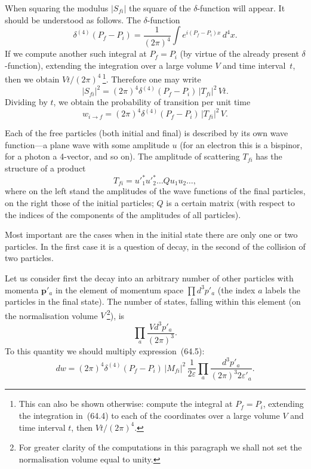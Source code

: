 When squaring the modulus $|S_{fi}|$ the square of the $\delta$-function will appear. It should be understood as follows. The $\delta$-function
\begin{equation}
\delta^{(4)}(P_f - P_i) = \frac{1}{(2\pi)^4}\int e^{i(P_f - P_i)x}\,d^4x.
\tag{64.4}
\end{equation}
If we compute another such integral at $P_f = P_i$ (by virtue of the already present $\delta$-function), extending the integration over a large volume $V$ and time interval~$t$, then we obtain $Vt/(2\pi)^4$\,\footnote{This can also be shown otherwise: compute the integral at $P_f = P_i$, extending the integration in~(64.4) to each of the coordinates over a large volume $V$ and time interval $t$, then $Vt/(2\pi)^4$.}. Therefore one may write
\[
|S_{fi}|^2 = (2\pi)^4\delta^{(4)}(P_f - P_i)\,|T_{fi}|^2\,Vt.
\]
Dividing by $t$, we obtain the probability of transition per unit time
\begin{equation}
w_{i\to f} = (2\pi)^4\delta^{(4)}(P_f - P_i)\,|T_{fi}|^2\,V.
\tag{64.5}
\end{equation}

Each of the free particles (both initial and final) is described by its own wave function---a plane wave with some amplitude $u$ (for an electron this is a bispinor, for a photon a 4-vector, and so on). The amplitude of scattering $T_{fi}$ has the structure of a product
\begin{equation}
T_{fi} = u'^*_1 u'^*_2 \ldots Q u_1 u_2\ldots,
\tag{64.6}
\end{equation}
where on the left stand the amplitudes of the wave functions of the final particles, on the right those of the initial particles; $Q$ is a certain matrix (with respect to the indices of the components of the amplitudes of all particles).

Most important are the cases when in the initial state there are only one or two particles. In the first case it is a question of decay, in the second of the collision of two particles.

Let us consider first the decay into an arbitrary number of other particles with momenta $\mathbf{p}'_a$ in the element of momentum space $\prod d^3p'_a$ (the index $a$ labels the particles in the final state). The number of states, falling within this element (on the normalisation volume $V$\,\footnote{For greater clarity of the computations in this paragraph we shall not set the normalisation volume equal to unity.}), is
\[
\prod_a\frac{Vd^3p'_a}{(2\pi)^3}.
\]
To this quantity we should multiply expression~(64.5):
\begin{equation}
dw = (2\pi)^4\delta^{(4)}(P_f - P_i)\,|M_{fi}|^2\,\frac{1}{2\varepsilon}\prod_a\frac{d^3p'_a}{(2\pi)^3 2\varepsilon'_a}.
\tag{64.11}
\end{equation}

